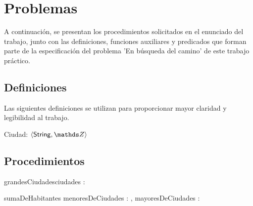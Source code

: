 \documentclass[10pt,a4paper]{article}
\newcommand{\ciudad}{\ensuremath{\langle \mathsf{String} , \ent \rangle}}
\begin{document}
\maketitle

\section{Problemas}
A continuación, se presentan los procedimientos solicitados en el enunciado del trabajo, junto con las definiciones, funciones auxiliares y predicados que forman parte de la especificación del problema 'En búsqueda del camino' de este trabajo práctico.

\subsection{Definiciones}
Las siguientes definiciones se utilizan para proporcionar mayor claridad y legibilidad al trabajo.

Ciudad:   \ciudad


\subsection{Procedimientos}


\begin{proc}{grandesCiudades}{\In ciudades : }{ }
\end{proc}

\begin{proc}{sumaDeHabitantes}
	{\In menoresDeCiudades : , \In mayoresDeCiudades : }{ }

\end{proc}
\end{document}
